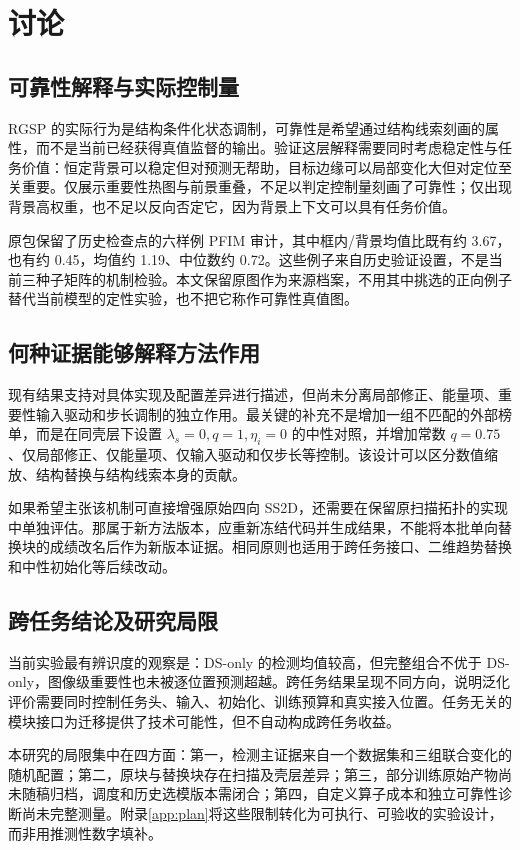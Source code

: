 \documentclass[UTF8,11pt,a4paper,fontset=fandol]{ctexart}
\begin{document}
\section{讨论}\label{sec:discussion}
\subsection{可靠性解释与实际控制量}
RGSP 的实际行为是结构条件化状态调制，可靠性是希望通过结构线索刻画的属性，而不是当前已经获得真值监督的输出。验证这层解释需要同时考虑稳定性与任务价值：恒定背景可以稳定但对预测无帮助，目标边缘可以局部变化大但对定位至关重要。仅展示重要性热图与前景重叠，不足以判定控制量刻画了可靠性；仅出现背景高权重，也不足以反向否定它，因为背景上下文可以具有任务价值。

原包保留了历史检查点的六样例 PFIM 审计，其中框内/背景均值比既有约 3.67，也有约 0.45，均值约 1.19、中位数约 0.72。这些例子来自历史验证设置，不是当前三种子矩阵的机制检验。本文保留原图作为来源档案，不用其中挑选的正向例子替代当前模型的定性实验，也不把它称作可靠性真值图。

\subsection{何种证据能够解释方法作用}
现有结果支持对具体实现及配置差异进行描述，但尚未分离局部修正、能量项、重要性输入驱动和步长调制的独立作用。最关键的补充不是增加一组不匹配的外部榜单，而是在同壳层下设置 $\lambda_s=0,q=1,\eta_i=0$ 的中性对照，并增加常数 $q=0.75$、仅局部修正、仅能量项、仅输入驱动和仅步长等控制。该设计可以区分数值缩放、结构替换与结构线索本身的贡献。

如果希望主张该机制可直接增强原始四向 SS2D，还需要在保留原扫描拓扑的实现中单独评估。那属于新方法版本，应重新冻结代码并生成结果，不能将本批单向替换块的成绩改名后作为新版本证据。相同原则也适用于跨任务接口、二维趋势替换和中性初始化等后续改动。

\subsection{跨任务结论及研究局限}
当前实验最有辨识度的观察是：DS-only 的检测均值较高，但完整组合不优于 DS-only，图像级重要性也未被逐位置预测超越。跨任务结果呈现不同方向，说明泛化评价需要同时控制任务头、输入、初始化、训练预算和真实接入位置。任务无关的模块接口为迁移提供了技术可能性，但不自动构成跨任务收益。

本研究的局限集中在四方面：第一，检测主证据来自一个数据集和三组联合变化的随机配置；第二，原块与替换块存在扫描及壳层差异；第三，部分训练原始产物尚未随稿归档，调度和历史选模版本需闭合；第四，自定义算子成本和独立可靠性诊断尚未完整测量。附录\ref{app:plan}将这些限制转化为可执行、可验收的实验设计，而非用推测性数字填补。
\end{document}
